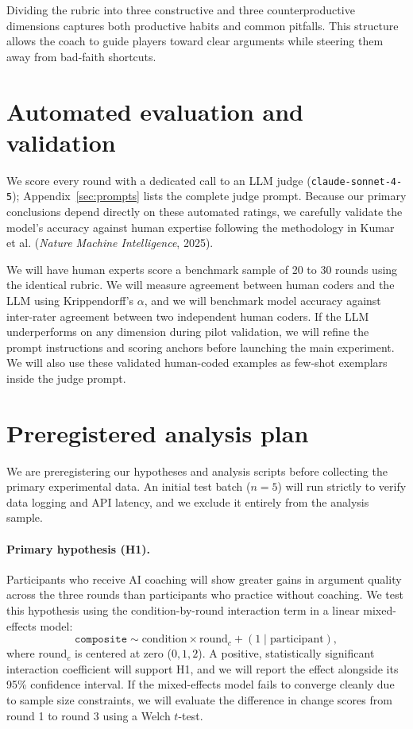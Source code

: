 \documentclass[11pt]{article}
\begin{document}
Dividing the rubric into three constructive and three counterproductive dimensions captures both productive habits and common pitfalls. This structure allows the coach to guide players toward clear arguments while steering them away from bad-faith shortcuts.

\section{Automated evaluation and validation}
\label{sec:judge}

We score every round with a dedicated call to an LLM judge (\texttt{claude-sonnet-4-5}); Appendix~\ref{sec:prompts} lists the complete judge prompt. Because our primary conclusions depend directly on these automated ratings, we carefully validate the model's accuracy against human expertise following the methodology in Kumar et al. (\emph{Nature Machine Intelligence}, 2025).

We will have human experts score a benchmark sample of 20 to 30 rounds using the identical rubric. We will measure agreement between human coders and the LLM using Krippendorff's $\alpha$, and we will benchmark model accuracy against inter-rater agreement between two independent human coders. If the LLM underperforms on any dimension during pilot validation, we will refine the prompt instructions and scoring anchors before launching the main experiment. We will also use these validated human-coded examples as few-shot exemplars inside the judge prompt.

\section{Preregistered analysis plan}
\label{sec:analysis}

We are preregistering our hypotheses and analysis scripts before collecting the primary experimental data. An initial test batch ($n = 5$) will run strictly to verify data logging and API latency, and we exclude it entirely from the analysis sample.

\paragraph{Primary hypothesis (H1).} Participants who receive AI coaching will show greater gains in argument quality across the three rounds than participants who practice without coaching. We test this hypothesis using the condition-by-round interaction term in a linear mixed-effects model:
\[
  \texttt{composite} \sim \text{condition} \times \text{round}_c + (1 \mid \text{participant}),
\]
where $\text{round}_c$ is centered at zero ($0, 1, 2$). A positive, statistically significant interaction coefficient will support H1, and we will report the effect alongside its 95\% confidence interval. If the mixed-effects model fails to converge cleanly due to sample size constraints, we will evaluate the difference in change scores from round 1 to round 3 using a Welch $t$-test.
\end{document}
